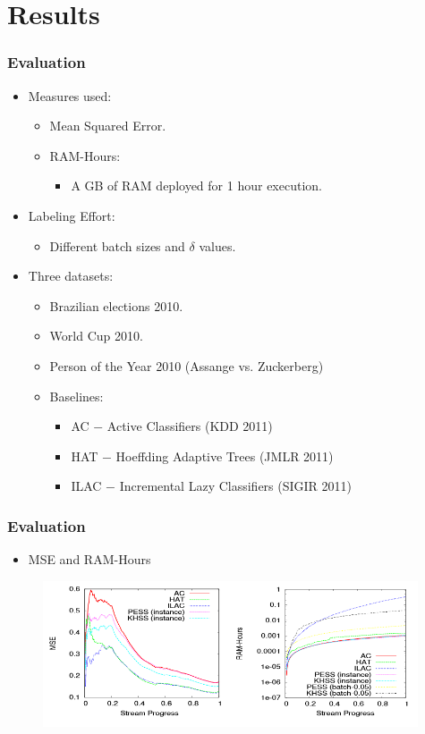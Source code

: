 \documentclass[14pt]{beamer}
\begin{document}
\section{Results}

\begin{frame}\frametitle{Evaluation}

\begin{itemize}
\item Measures used:
\begin{itemize}
\item Mean Squared Error.
\item RAM-Hours:
\begin{itemize}
\item A GB of RAM deployed for 1 hour execution.
\end{itemize}
\end{itemize}
\item Labeling Effort:
\begin{itemize}
\item Different batch sizes and $\delta$ values.
\end{itemize}
\item Three datasets:
\begin{itemize}
\item Brazilian elections 2010.
\item World Cup 2010.
\item Person of the Year 2010 (Assange vs. Zuckerberg)
\end{itemize}
\begin{itemize}
\item Baselines:
\begin{itemize}
\item AC $-$ Active Classifiers (KDD 2011)
\item HAT $-$ Hoeffding Adaptive Trees (JMLR 2011)
\item ILAC $-$ Incremental Lazy Classifiers (SIGIR 2011)
\end{itemize}
\end{itemize}
\end{itemize}

\end{frame}

\begin{frame}\frametitle{Evaluation}

\begin{itemize}
\item MSE and RAM-Hours
\end{itemize}

\begin{figure}
\centering
\includegraphics[height=1.70in]{results3}
\end{figure}

\end{frame}
\end{document}
